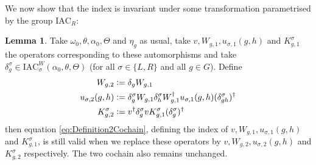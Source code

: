 \documentclass[12pt,a4paper,twoside]{article}
\newcommand{\IAC}{\textrm{IAC}}
\newcommand{\defeq}{\vcentcolon=}
\theoremstyle{definition}
\newtheorem{lemma}[theorem]{Lemma}
\numberwithin{equation}{section}
\begin{document}
We now show that the index is invariant under some transformation parametrised by the group $\IAC_R$:
\begin{lemma}\label{lem:TransformationUnderDelta}
	Take $\omega_0,\theta,\alpha_0,\Theta$ and $\eta_g$ as usual, take $v,W_{g,1},u_{\sigma,1}(g,h)$ and $K_{g,1}^\sigma$ the operators corresponding to these automorphisms and take $\delta^\sigma_g\in\IAC_\sigma^W(\alpha_0,\theta,\Theta)$ (for all $\sigma\in\{L,R\}$ and all $g\in G$). Define
	\begin{align}
		W_{g,2}&\defeq\delta_g W_{g,1}\\
		u_{\sigma,2}(g,h)&\defeq \delta_g^\sigma W_{g,1}\delta_h^\sigma W_{g,1}^\dagger u_{\sigma,1}(g,h)(\delta_{gh}^\sigma)^\dagger\\
		K^\sigma_{g,2}&\defeq v^\dagger \delta_g^\sigma v K_{g,1}^\sigma (\delta_g^\sigma)^\dagger
	\end{align}
	then equation \eqref{eq:Definition2Cochain}, defining the index of $v,W_{g,1},u_{\sigma,1}(g,h)$ and $K_{g,1}^\sigma$, is still valid when we replace these operators by $v,W_{g,2},u_{\sigma,2}(g,h)$ and $K_{g,2}^\sigma$ respectively. The two cochain also remains unchanged.
\end{lemma}
\end{document}
